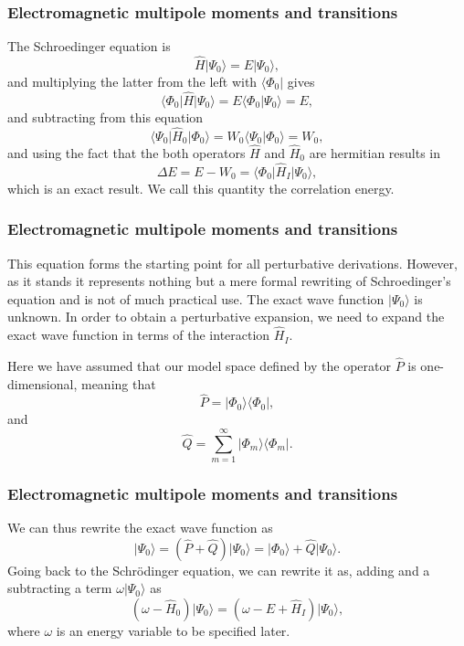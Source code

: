 \documentclass{beamer}
\begin{document}
\begin{frame}
\frametitle{Electromagnetic multipole moments and transitions}

\begin{block}{}
The Schroedinger equation is
\[
\hat{H}\vert \Psi_0\rangle = E\vert \Psi_0\rangle,
\]
and multiplying the latter from the left with $\langle \Phi_0\vert $ gives
\[
\langle \Phi_0\vert \hat{H}\vert \Psi_0\rangle = E\langle \Phi_0\vert \Psi_0\rangle=E,
\]
and subtracting from this equation
\[
\langle \Psi_0\vert \hat{H}_0\vert \Phi_0\rangle= W_0\langle \Psi_0\vert \Phi_0\rangle=W_0,
\]
and using the fact that the both operators $\hat{H}$ and $\hat{H}_0$ are hermitian 
results in
\[
\Delta E=E-W_0=\langle \Phi_0\vert \hat{H}_I\vert \Psi_0\rangle,
\]
which is an exact result. We call this quantity the correlation energy.
\end{block}
\end{frame}

\begin{frame}
\frametitle{Electromagnetic multipole moments and transitions}

\begin{block}{}
This equation forms the starting point for all perturbative derivations. However,
as it stands it represents nothing but a mere formal rewriting of Schroedinger's equation and is not of much practical use. The exact wave function $\vert \Psi_0\rangle$ is unknown. In order to obtain a perturbative expansion, we need to expand the exact wave function in terms of the interaction $\hat{H}_I$. 

Here we have assumed that our model space defined by the operator $\hat{P}$ is one-dimensional, meaning that
\[
\hat{P}= \vert \Phi_0\rangle \langle \Phi_0\vert ,
\]
and
\[
\hat{Q}=\sum_{m=1}^{\infty}\vert \Phi_m\rangle \langle \Phi_m\vert .
\]
\end{block}
\end{frame}

\begin{frame}
\frametitle{Electromagnetic multipole moments and transitions}

\begin{block}{}
We can thus rewrite the exact wave function as
\[
\vert \Psi_0\rangle= (\hat{P}+\hat{Q})\vert \Psi_0\rangle=\vert \Phi_0\rangle+\hat{Q}\vert \Psi_0\rangle.
\]
Going back to the Schr\"odinger equation, we can rewrite it as, adding and a subtracting a term $\omega \vert \Psi_0\rangle$ as
\[
\left(\omega-\hat{H}_0\right)\vert \Psi_0\rangle=\left(\omega-E+\hat{H}_I\right)\vert \Psi_0\rangle,
\]
where $\omega$ is an energy variable to be specified later. 
\end{block}
\end{frame}
\end{document}
